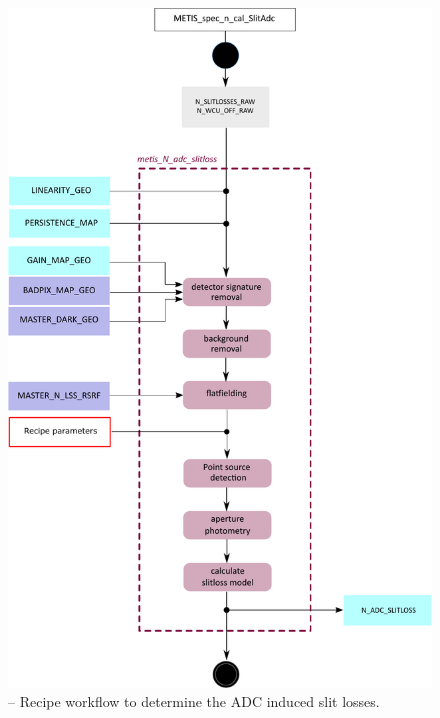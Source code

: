 \begin{figure}[ht]
  \centering
  \includegraphics[width=0.5\textheight]{figures/metis_n_adc_slitloss_v0.83.pdf}
  \caption[Recipe: ]{ --
    Recipe workflow to determine the \ac{ADC} induced slit losses.}
  \label{Fig:rec_n_adc_slitloss}
\end{figure}

